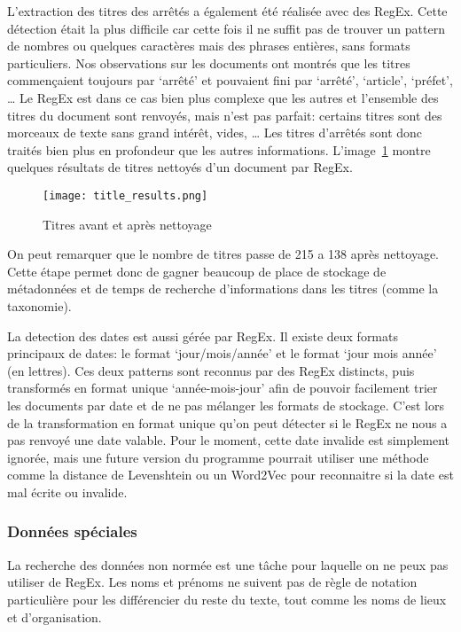 L'extraction des titres des arrêtés a également été réalisée avec des RegEx.
Cette détection était la plus difficile car cette fois il ne suffit pas de trouver un pattern de nombres ou quelques caractères mais des phrases entières, sans formats particuliers.
Nos observations sur les documents ont montrés que les titres commençaient toujours par `arrêté' et pouvaient fini par `arrêté', `article', `préfet', \ldots
Le RegEx est dans ce cas bien plus complexe que les autres et l'ensemble des titres du document sont renvoyés, mais n'est pas parfait: certains titres sont des morceaux de texte sans grand intérêt, vides, \ldots
Les titres d'arrêtés sont donc traités bien plus en profondeur que les autres informations.
L'image~\ref{fig:regexTitles} montre quelques résultats de titres nettoyés d'un document par RegEx.

\begin{figure}[h!]
  \centering
  \texttt{[image: title\_results.png]}
	\caption[]{Titres avant et après nettoyage}
	\label{fig:regexTitles}
\end{figure}

On peut remarquer que le nombre de titres passe de 215 a 138 après nettoyage.
Cette étape permet donc de gagner beaucoup de place de stockage de métadonnées et de temps de recherche d'informations dans les titres (comme la taxonomie).


La detection des dates est aussi gérée par RegEx.
Il existe deux formats principaux de dates: le format `jour/mois/année' et le format `jour mois année' (en lettres).
Ces deux patterns sont reconnus par des RegEx distincts, puis transformés en format unique `année-mois-jour' afin de pouvoir facilement trier les documents par date et de ne pas mélanger les formats de stockage.
C'est lors de la transformation en format unique qu'on peut détecter si le RegEx ne nous a pas renvoyé une date valable.
Pour le moment, cette date invalide est simplement ignorée, mais une future version du programme pourrait utiliser une méthode comme la distance de Levenshtein ou un Word2Vec pour reconnaitre si la date est mal écrite ou invalide.




\subsubsection{Données spéciales}
La recherche des données non normée est une tâche pour laquelle on ne peux pas utiliser de RegEx.
Les noms et prénoms ne suivent pas de règle de notation particulière pour les différencier du reste du texte, tout comme les noms de lieux et d'organisation.


